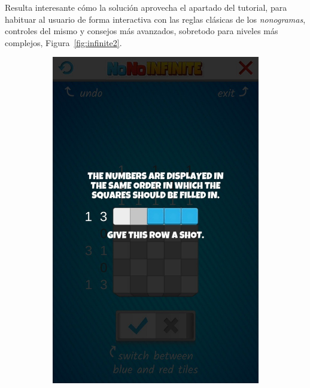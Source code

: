 \documentclass[11pt,spanish,listoffigures,listoftables]{tfgetsinf}
\begin{document}
Resulta interesante cómo la solución aprovecha el apartado del tutorial, para habituar al usuario de forma interactiva con las reglas clásicas de los 
\textit{nonogramas}, controles del mismo y consejos más avanzados, sobretodo para niveles más complejos, Figura~\ref{fig:infinite2}.

\begin{figure}[H]
   \centering
   \begin{subfigure}[b]{0.4\linewidth}
     \includegraphics[width=\linewidth]{images/infinite3.jpg}
   \end{subfigure}
   \begin{subfigure}[b]{0.4\linewidth}

\end{subfigure}
\end{figure}
\end{document}
